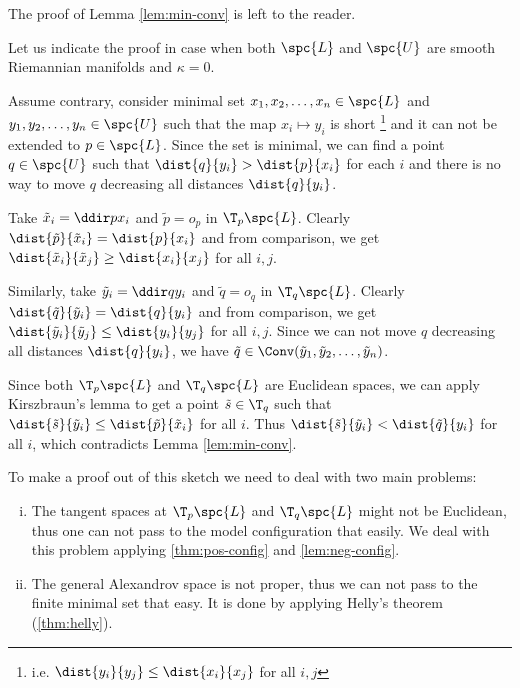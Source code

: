 {The proof of Lemma \ref{lem:min-conv} is left to the reader.

Let us indicate the proof 
in case when both $\spc{L}$ and $\spc{U}$ are smooth Riemannian manifolds 
and $\kappa=0$.

Assume contrary, consider minimal set $x_1,x_2,\dots,x_n\in \spc{L}$ and $y_1,y_2,\dots,y_n\in \spc{U}$ 
such that the map $x_i\mapsto y_i$ is short%
\footnote{i.e. $\dist{y_i}{y_j}\le\dist{x_i}{x_j}$ for all $i,j$} 
and it can not be extended to $p\in \spc{L}$.
Since the set is minimal, we can find a point $q\in \spc{U}$ such that $\dist{q}{y_i}>\dist{p}{x_i}$ for each $i$ and there is no way to move $q$ decreasing all distances $\dist{q}{y_i}$.

Take $\tilde x_i=\ddir p{x_i}$ and $\tilde p=o_p$ in $\T_p \spc{L}$.
Clearly $\dist{\tilde p}{\tilde x_i}=\dist{p}{x_i}$ and from comparison, we get $\dist{\tilde x_i}{\tilde x_j}\ge\dist{x_i}{x_j}$ for all $i,j$.

Similarly, take $\tilde y_i=\ddir q{y_i}$ and $\tilde q=o_q$ in $\T_q \spc{L}$.
Clearly $\dist{\tilde q}{\tilde y_i}=\dist{q}{y_i}$ and from comparison, we get $\dist{\tilde y_i}{\tilde y_j}\le\dist{y_i}{y_j}$ for all $i,j$.
Since we can not move $q$ decreasing all distances $\dist{q}{y_i}$, we have $\tilde q\in\Conv(\tilde y_1,\tilde y_2,\dots,\tilde y_n)$.

Since both $\T_p \spc{L}$ and $\T_q \spc{L}$ are Euclidean spaces, we can apply Kirszbraun's lemma to get a point $\tilde s\in \T_q$ such that $\dist{\tilde s}{\tilde y_i}\le\dist{\tilde p}{\tilde x_i}$ for all $i$.
Thus $\dist{\tilde s}{\tilde y_i}<\dist{\tilde q}{y_i}$ for all $i$, which contradicts Lemma \ref{lem:min-conv}.
\qeds

To make a proof out of this sketch we need to deal with two main problems:
\begin{enumerate}[(i)]

\item The tangent spaces at $\T_p \spc{L}$ and $\T_q \spc{L}$ might not be Euclidean, thus one can not pass to the model configuration that easily. 
We deal with this problem applying \ref{thm:pos-config} and \ref{lem:neg-config}.

\item The general Alexandrov space is not proper, thus we can not pass to the finite minimal set that easy. It is done by applying Helly's theorem (\ref{thm:helly}).
\end{enumerate}


















}
